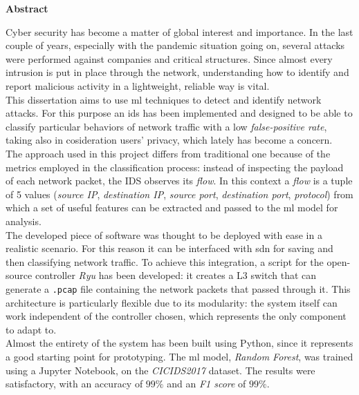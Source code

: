 \thispagestyle{empty}

{\bf\Huge Abstract}

\vspace{1cm}

\hfill\begin{minipage}{\dimexpr\textwidth-0.5cm}
    Cyber security has become a matter of global interest and importance. In the last couple of years, especially with the pandemic situation going on, several attacks were performed against companies and critical structures. Since almost every intrusion is put in place through the network, understanding how to identify and report malicious activity in a lightweight, reliable way is vital. \\

    This dissertation aims to use \gls{ml} techniques to detect and identify network attacks. For this purpose an \gls{ids} has been implemented and designed to be able to classify particular behaviors of network traffic with a low \textit{false-positive rate}, taking also in cosideration users' privacy, which lately has become a concern. \\ The approach used in this project differs from traditional one because of the metrics employed in the classification process: instead of inspecting the payload of each network packet, the IDS observes its \textit{flow}. In this context a \textit{flow} is a tuple of 5 values (\textit{source IP}, \textit{destination IP}, \textit{source port}, \textit{destination port}, \textit{protocol}) from which a set of useful features can be extracted and passed to the \gls{ml} model for analysis. \\ 
    
    The developed piece of software was thought to be deployed with ease in a realistic scenario. For this reason it can be interfaced with \gls{sdn} for saving and then classifying network traffic. To achieve this integration, a script for the open-source controller \textit{Ryu} has been developed: it creates a L3 switch that can generate a \texttt{.pcap} file containing the network packets that passed through it. This architecture is particularly flexible due to its modularity: the system itself can work independent of the controller chosen, which represents the only component to adapt to.\\ Almost the entirety of the system has been built using Python, since it represents a good starting point for prototyping. The \gls{ml} model, \textit{Random Forest}, was trained using a Jupyter Notebook, on the \textit{CICIDS2017} dataset. The results were satisfactory, with an accuracy of $99\%$ and an \textit{F1 score} of $99\%$.
    \end{minipage}

